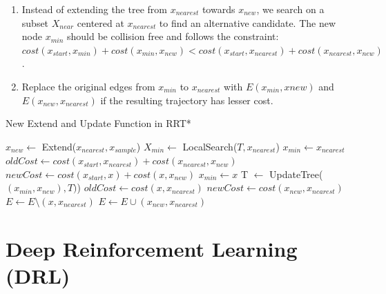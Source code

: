 \documentclass[../thesis.tex]{subfiles}
\begin{document}
\begin{enumerate}
 
      \item Instead of extending the tree from $x_{nearest}$ towards $x_{new}$, we search on a subset $X_{near}$ centered at $x_{nearest}$ to find an alternative candidate. The new node $x_{min}$ should be collision free and follows the constraint: $cost(x_{start},x_{min}) + cost(x_{min}, x_{new}) < cost(x_{start},x_{nearest}) + cost(x_{nearest}, x_{new})$.
      
      \item Replace the original edges from $x_{min}$ to $x_{nearest}$ with $E(x_{min}, x{new})$ and $E(x_{new}, x_{nearest})$ if the resulting trajectory has lesser cost.
 
\end{enumerate}
 
\begin{algorithm}
  \caption{New Extend and Update Function in RRT*} \label{alg:RRT_star}
  \begin{algorithmic}[1]
  \State $x_{new} \leftarrow $ Extend($x_{nearest}, x_{sample}$)
  \State $X_{min} \leftarrow $ LocalSearch($T, x_{nearest}$)
  \State $x_{min} \leftarrow x_{nearest}$
    \State $oldCost \leftarrow cost(x_{start},x_{nearest}) + cost(x_{nearest}, x_{new})$
    \State $newCost \leftarrow cost(x_{start},x) + cost(x, x_{new})$
    \State $x_{min} \leftarrow x$
    \EndIf
  \EndFor
  \State T $\leftarrow $ UpdateTree($(x_{min},x_{new}), T)$)
    \State $oldCost \leftarrow cost(x, x_{nearest})$
    \State $newCost \leftarrow cost(x_{new}, x_{nearest})$
          \State $E \leftarrow E \setminus (x, x_{nearest})$
          \State $E \leftarrow E \cup (x_{new}, x_{nearest})$
    \EndIf
  \EndFor
  \end{algorithmic}
\end{algorithm}
 

 
 
\section{Deep Reinforcement Learning (DRL)}
 
 
\end{document}
